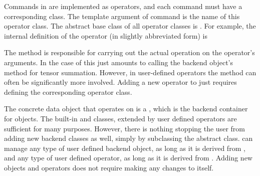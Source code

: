 Commands in \Cengine{} are implemented as operators, and each command must have a 
corresponding class. The template argument of  
command is the name of this operator class. The abstract base class of all 
operator classes is .  
For example, the internal definition of the  operator 
(in slightly abbreviated form) is  

\mbox{} 

The  method is responsible for carrying out the actual operation on 
the operator's arguments. In the case of  this just amounts to 
calling the backend object's method for tensor summation. 
However, in user-defined operators the  method can often be significantly more involved. 
Adding a new operator to \Cengine{} just requires defining the corresponding operator class. 

The concrete data object that  operates on is a , 
which is the backend container for  objects. 
The built-in  and  classes, 
extended by user defined operators are sufficient for many purposes. 
However, there is nothing stopping the user from adding new backend classes as well, simply 
by subclassing the  abstract class. 
\Cengine{} can manage any type of user defined backend object, as long as it is derived from 
, and any type of user defined operator, as long as it is derived from 
. 
Adding new objects and operators does not require making any changes to \Cengine{} itself.  

